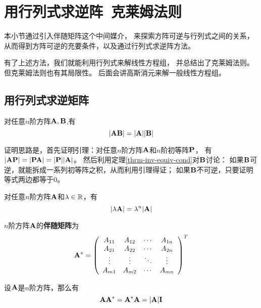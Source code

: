 \section{用行列式求逆阵\ 克莱姆法则}
本小节通过引入伴随矩阵这个中间媒介，
来探索方阵可逆与行列式之间的关系，
从而得到方阵可逆的充要条件，以及通过行列式求逆阵方法。

有了上述方法，我们就能利用行列式来解线性方程组，
并总结出了克莱姆法则。但克莱姆法则也有其局限性。
后面会讲高斯消元来解一般线性方程组。

\subsection{用行列式求逆矩阵}
\begin{theorem}[行列式乘法规则] \label{thrm-det-mul}
  对任意$n$阶方阵$\mmA,\mmB$,有
  \[ |\mmA\mmB|=|\mmA||\mmB| \]
\end{theorem}

\begin{remark}
  证明思路是，首先证明引理：对任意$n$阶方阵$\mmA$和$n$阶初等阵$\mmP$，
  有$|\mmA\mmP|=|\mmP\mmA|=|\mmP||\mmA|$。
  然后利用定理\ref{thrm-inv-equiv-cond}对$\mmB$讨论：
  如果$\mmB$可逆，就能拆成一系列初等阵之积，从而利用引理得证；
  如果$\mmB$不可逆，只要证明等式两边都等于0。
\end{remark}

\begin{theorem}[行列式数乘规则] \label{thrm-det-num-mul}
  对任意$n$阶方阵$\mmA$和$\lambda\in\mfR$，有
  \[ |\lambda\mmA| = \lambda^n|\mmA| \]
\end{theorem}

\begin{definition}[伴随矩阵]
  $n$阶方阵$\mmA$的\textbf{伴随矩阵}为
  \begin{displaymath}
    \mmA^* = \mmat{cccc}{
      A_{11} & A_{12} & \cdots & A_{1n} \\
      A_{21} & A_{22} & \cdots & A_{2n} \\
      \vdots & \vdots & \ddots & \vdots \\
      A_{m1} & A_{m2} & \cdots & A_{mn} }^T
  \end{displaymath}
\end{definition}

\begin{theorem}[伴随矩阵的性质] \label{thrm-adjugate-mat-prop}
  设$\mmA$是$n$阶方阵，那么有
  \[ \mmA\mmA^*=\mmA^*\mmA=|\mmA|\mmI \]
\end{theorem}

